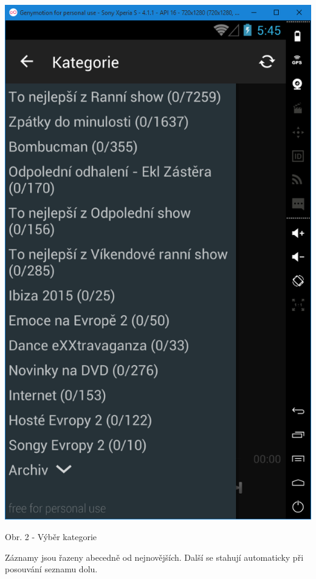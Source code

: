 \documentclass[12pt,a4paper,titlepage]{article}
\begin{document}
{	\begin{center}
		\includegraphics[scale=0.5]{archiv2.png}	
	\end{center}
	\begin{center}
		\footnotesize Obr. 2 - Výběr kategorie	
	\end{center}
	
	Záznamy jsou řazeny abecedně od nejnovějších. Další se stahují automaticky při posouvání seznamu dolu.	
	
}
\end{document}
